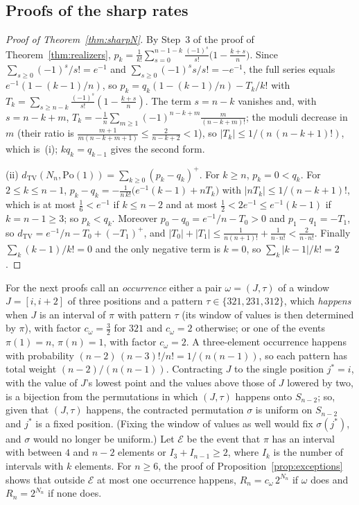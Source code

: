 \documentclass[11pt,a4paper]{article}
\theoremstyle{plain}
\theoremstyle{definition}
\theoremstyle{remark}
\begin{document}
\subsection*{Proofs of the sharp rates}
\begin{proof}[Proof of Theorem~\ref{thm:sharpN}]
By Step~3 of the proof of Theorem~\ref{thm:realizers}, $p_k=\frac1{k!}\sum_{s=0}^{n-1-k}\frac{(-1)^s}{s!}\bigl(1-\frac{k+s}n\bigr)$. Since $\sum_{s\ge0}(-1)^s/s!=e^{-1}$ and $\sum_{s\ge0}(-1)^ss/s!=-e^{-1}$, the full series equals $e^{-1}(1-(k-1)/n)$, so $p_k=q_k(1-(k-1)/n)-T_k/k!$ with $T_k=\sum_{s\ge n-k}\frac{(-1)^s}{s!}(1-\frac{k+s}n)$. The term $s=n-k$ vanishes and, with $s=n-k+m$, $T_k=-\frac1n\sum_{m\ge1}(-1)^{n-k+m}\frac{m}{(n-k+m)!}$; the moduli decrease in $m$ (their ratio is $\frac{m+1}{m(n-k+m+1)}\le\frac2{n-k+2}<1$), so $|T_k|\le1/(n\,(n-k+1)!)$, which is~(i); $kq_k=q_{k-1}$ gives the second form.

(ii) $d_{\mathrm{TV}}(N_n,\mathrm{Po}(1))=\sum_{k\ge0}(p_k-q_k)^+$. For $k\ge n$, $p_k=0<q_k$. For $2\le k\le n-1$, $p_k-q_k=-\frac1{n\,k!}\bigl(e^{-1}(k-1)+nT_k\bigr)$ with $|nT_k|\le1/(n-k+1)!$, which is at most $\frac16<e^{-1}$ if $k\le n-2$ and at most $\frac12<2e^{-1}\le e^{-1}(k-1)$ if $k=n-1\ge3$; so $p_k<q_k$. Moreover $p_0-q_0=e^{-1}/n-T_0>0$ and $p_1-q_1=-T_1$, so $d_{\mathrm{TV}}=e^{-1}/n-T_0+(-T_1)^+$, and $|T_0|+|T_1|\le\frac1{n(n+1)!}+\frac1{n\cdot n!}<\frac2{n\cdot n!}$. Finally $\sum_k(k-1)/k!=0$ and the only negative term is $k=0$, so $\sum_k|k-1|/k!=2$.
\end{proof}

\noindent For the next proofs call an \emph{occurrence} either a pair $\omega=(J,\tau)$ of a window $J=[i,i+2]$ of three positions and a pattern $\tau\in\{321,231,312\}$, which \emph{happens} when $J$ is an interval of $\pi$ with pattern $\tau$ (its window of values is then determined by $\pi$), with factor $c_\omega=\tfrac32$ for $321$ and $c_\omega=2$ otherwise; or one of the events $\pi(1)=n$, $\pi(n)=1$, with factor $c_\omega=2$. A three-element occurrence happens with probability $(n-2)\,(n-3)!/n!=1/(n(n-1))$, so each pattern has total weight $(n-2)/(n(n-1))$. Contracting $J$ to the single position $j^*=i$, with the value of $J$'s lowest point and the values above those of $J$ lowered by two, is a bijection from the permutations in which $(J,\tau)$ happens onto $S_{n-2}$; so, given that $(J,\tau)$ happens, the contracted permutation $\sigma$ is uniform on $S_{n-2}$ and $j^*$ is a fixed position. (Fixing the window of values as well would fix $\sigma(j^*)$, and $\sigma$ would no longer be uniform.) Let $\mathcal E$ be the event that $\pi$ has an interval with between $4$ and $n-2$ elements or $I_3+I_{n-1}\ge2$, where $I_k$ is the number of intervals with $k$ elements. For $n\ge6$, the proof of Proposition~\ref{prop:exceptions} shows that outside $\mathcal E$ at most one occurrence happens, $R_n=c_\omega\,2^{N_n}$ if $\omega$ does and $R_n=2^{N_n}$ if none does.
\end{document}
